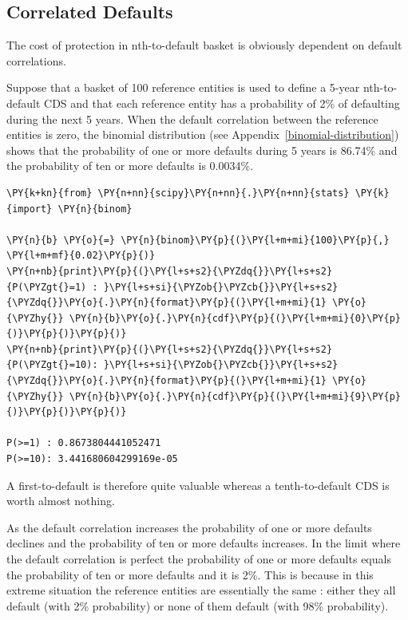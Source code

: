 \subsection{Correlated Defaults}\label{correlated-defaults}
The cost of protection in nth-to-default basket is obviously dependent
on default correlations. 

Suppose that a basket of 100 reference entities is used to define a 5-year nth-to-default CDS and that each reference entity has a probability of 2\% of defaulting during the next
5 years. When the default correlation between the reference entities is zero, the binomial distribution (see Appendix~\ref{binomial-distribution}) 
shows that the probability of one or more defaults during 5 years is 86.74\% and the probability of ten or more defaults is 0.0034\%.

\begin{tcolorbox}[breakable, size=fbox, boxrule=1pt, pad at break*=1mm,colback=cellbackground, colframe=cellborder]
\begin{Verbatim}[commandchars=\\\{\}]
\PY{k+kn}{from} \PY{n+nn}{scipy}\PY{n+nn}{.}\PY{n+nn}{stats} \PY{k}{import} \PY{n}{binom}
	
\PY{n}{b} \PY{o}{=} \PY{n}{binom}\PY{p}{(}\PY{l+m+mi}{100}\PY{p}{,} \PY{l+m+mf}{0.02}\PY{p}{)}
\PY{n+nb}{print}\PY{p}{(}\PY{l+s+s2}{\PYZdq{}}\PY{l+s+s2}{P(\PYZgt{}=1) : }\PY{l+s+si}{\PYZob{}\PYZcb{}}\PY{l+s+s2}{\PYZdq{}}\PY{o}{.}\PY{n}{format}\PY{p}{(}\PY{l+m+mi}{1} \PY{o}{\PYZhy{}} \PY{n}{b}\PY{o}{.}\PY{n}{cdf}\PY{p}{(}\PY{l+m+mi}{0}\PY{p}{)}\PY{p}{)}\PY{p}{)}
\PY{n+nb}{print}\PY{p}{(}\PY{l+s+s2}{\PYZdq{}}\PY{l+s+s2}{P(\PYZgt{}=10): }\PY{l+s+si}{\PYZob{}\PYZcb{}}\PY{l+s+s2}{\PYZdq{}}\PY{o}{.}\PY{n}{format}\PY{p}{(}\PY{l+m+mi}{1} \PY{o}{\PYZhy{}} \PY{n}{b}\PY{o}{.}\PY{n}{cdf}\PY{p}{(}\PY{l+m+mi}{9}\PY{p}{)}\PY{p}{)}\PY{p}{)}
	
P(>=1) : 0.8673804441052471
P(>=10): 3.441680604299169e-05
\end{Verbatim}
\end{tcolorbox}

A first-to-default is therefore quite valuable whereas a tenth-to-default CDS is worth almost nothing.

As the default correlation increases the probability of one or more defaults declines and the probability of ten or more defaults increases. In the limit where the default correlation is perfect the probability of one or more defaults equals the probability of ten or more defaults and it is 2\%. This is because in this extreme situation the reference entities are essentially the same : either they all default (with 2\% probability) or none of them default (with 98\% probability).

